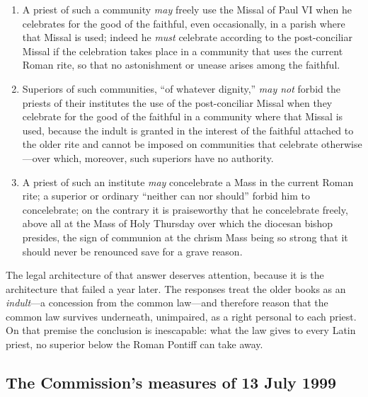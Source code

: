 \begin{enumerate}
\item A priest of such a community \emph{may} freely use the Missal of
Paul VI when he celebrates for the good of the faithful, even
occasionally, in a parish where that Missal is used; indeed he
\emph{must} celebrate according to the post-conciliar Missal if the
celebration takes place in a community that uses the current Roman rite,
so that no astonishment or unease arises among the faithful.
\item Superiors of such communities, ``of whatever dignity,'' \emph{may
not} forbid the priests of their institutes the use of the post-conciliar
Missal when they celebrate for the good of the faithful in a community
where that Missal is used, because the indult is granted in the interest
of the faithful attached to the older rite and cannot be imposed on
communities that celebrate otherwise---over which, moreover, such
superiors have no authority.
\item A priest of such an institute \emph{may} concelebrate a Mass in the
current Roman rite; a superior or ordinary ``neither can nor should''
forbid him to concelebrate; on the contrary it is praiseworthy that he
concelebrate freely, above all at the Mass of Holy Thursday over which the
diocesan bishop presides, the sign of communion at the chrism Mass being
so strong that it should never be renounced save for a grave reason.
\end{enumerate}

The legal architecture of that answer deserves attention, because it is
the architecture that failed a year later. The responses treat the older
books as an \emph{indult}---a concession from the common law---and
therefore reason that the common law survives underneath, unimpaired, as a
right personal to each priest. On that premise the conclusion is
inescapable: what the law gives to every Latin priest, no superior below
the Roman Pontiff can take away.

\subsection{The Commission's measures of 13 July 1999}

